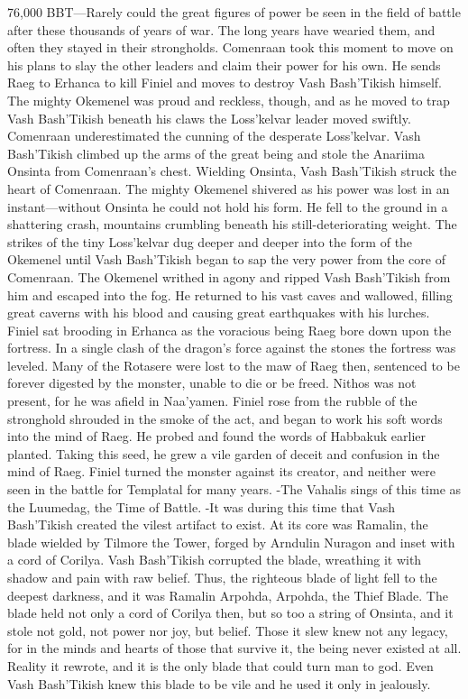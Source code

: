 \documentclass[smalldemyvopaper,11pt,twoside,onecolumn,openright,extrafontsizes]{memoir}
\begin{document}
{{76,000 BBT—Rarely could the great figures of power be seen in the field of battle after these thousands of years of war. The long years have wearied them, and often they stayed in their strongholds. Comenraan took this moment to move on his plans to slay the other leaders and claim their power for his own. He sends Raeg to Erhanca to kill Finiel and moves to destroy Vash Bash’Tikish himself. The mighty Okemenel was proud and reckless, though, and as he moved to trap Vash Bash’Tikish beneath his claws the Loss’kelvar leader moved swiftly. Comenraan underestimated the cunning of the desperate Loss’kelvar. Vash Bash’Tikish climbed up the arms of the great being and stole the Anariima Onsinta from Comenraan’s chest. Wielding Onsinta, Vash Bash’Tikish struck the heart of Comenraan. The mighty Okemenel shivered as his power was lost in an instant—without Onsinta he could not hold his form. He fell to the ground in a shattering crash, mountains crumbling beneath his still-deteriorating weight. The strikes of the tiny Loss’kelvar dug deeper and deeper into the form of the Okemenel until Vash Bash’Tikish began to sap the very power from the core of Comenraan. The Okemenel writhed in agony and ripped Vash Bash’Tikish from him and escaped into the fog. He returned to his vast caves and wallowed, filling great caverns with his blood and causing great earthquakes with his lurches.
	Finiel sat brooding in Erhanca as the voracious being Raeg bore down upon the fortress. In a single clash of the dragon’s force against the stones the fortress was leveled. Many of the Rotasere were lost to the maw of Raeg then, sentenced to be forever digested by the monster, unable to die or be freed. Nithos was not present, for he was afield in Naa’yamen. Finiel rose from the rubble of the stronghold shrouded in the smoke of the act, and began to work his soft words into the mind of Raeg. He probed and found the words of Habbakuk earlier planted. Taking this seed, he grew a vile garden of deceit and confusion in the mind of Raeg. Finiel turned the monster against its creator, and neither were seen in the battle for Templatal for many years.
	-The Vahalis sings of this time as the Luumedag, the Time of Battle.
-It was during this time that Vash Bash’Tikish created the vilest artifact to exist. At its core was Ramalin, the blade wielded by Tilmore the Tower, forged by Arndulin Nuragon and inset with a cord of Corilya. Vash Bash’Tikish corrupted the blade, wreathing it with shadow and pain with raw belief. Thus, the righteous blade of light fell to the deepest darkness, and it was Ramalin Arpohda, Arpohda, the Thief Blade. The blade held not only a cord of Corilya then, but so too a string of Onsinta, and it stole not gold, not power nor joy, but belief. Those it slew knew not any legacy, for in the minds and hearts of those that survive it, the being never existed at all. Reality it rewrote, and it is the only blade that could turn man to god. Even Vash Bash’Tikish knew this blade to be vile and he used it only in jealously.

}}
\end{document}
